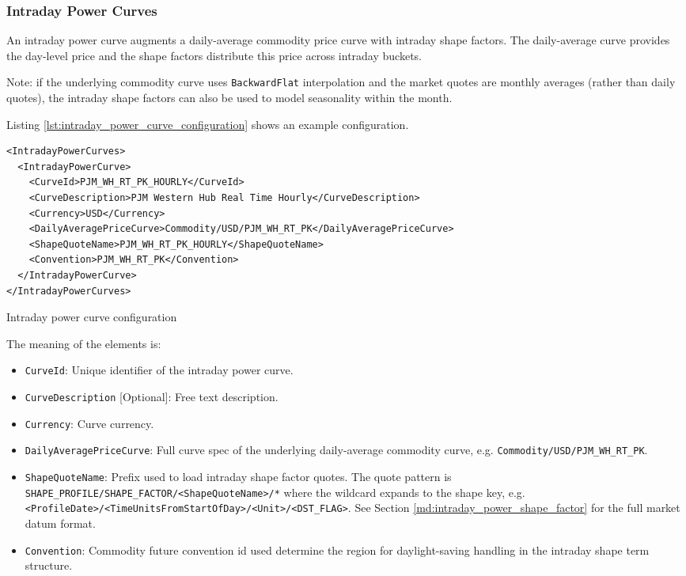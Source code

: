 \subsubsection{Intraday Power Curves}

An intraday power curve augments a daily-average commodity price curve with intraday shape factors. The daily-average
curve provides the day-level price and the shape factors distribute this price across intraday buckets.

Note: if the underlying commodity curve uses \lstinline!BackwardFlat! interpolation and the market quotes are monthly
averages (rather than daily quotes), the intraday shape factors can also be used to model seasonality within the month.

Listing \ref{lst:intraday_power_curve_configuration} shows an example configuration.

\begin{longlisting}
\begin{verbatim}
<IntradayPowerCurves>
  <IntradayPowerCurve>
    <CurveId>PJM_WH_RT_PK_HOURLY</CurveId>
    <CurveDescription>PJM Western Hub Real Time Hourly</CurveDescription>
    <Currency>USD</Currency>
    <DailyAveragePriceCurve>Commodity/USD/PJM_WH_RT_PK</DailyAveragePriceCurve>
    <ShapeQuoteName>PJM_WH_RT_PK_HOURLY</ShapeQuoteName>
    <Convention>PJM_WH_RT_PK</Convention>
  </IntradayPowerCurve>
</IntradayPowerCurves>
\end{verbatim}
\caption{Intraday power curve configuration}
\label{lst:intraday_power_curve_configuration}
\end{longlisting}

The meaning of the elements is:
\begin{itemize}
\item \lstinline!CurveId!: Unique identifier of the intraday power curve.
\item \lstinline!CurveDescription! [Optional]: Free text description.
\item \lstinline!Currency!: Curve currency.
\item \lstinline!DailyAveragePriceCurve!: Full curve spec of the underlying daily-average commodity curve, e.g. \lstinline!Commodity/USD/PJM_WH_RT_PK!.
\item \lstinline!ShapeQuoteName!: Prefix used to load intraday shape factor quotes. The quote pattern is \lstinline!SHAPE_PROFILE/SHAPE_FACTOR/<ShapeQuoteName>/*! where the wildcard expands to the shape key, e.g. \lstinline!<ProfileDate>/<TimeUnitsFromStartOfDay>/<Unit>/<DST_FLAG>!. See Section \ref{md:intraday_power_shape_factor} for the full market datum format.
\item \lstinline!Convention!: Commodity future convention id used determine the region for daylight-saving handling in the intraday shape term structure.
\end{itemize}

